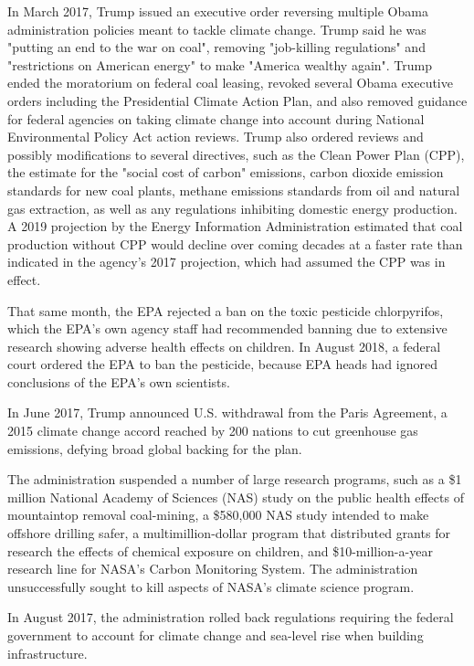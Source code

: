In March 2017, Trump issued an executive order reversing multiple Obama
administration policies meant to tackle climate change. Trump said he
was "putting an end to the war on coal", removing "job-killing
regulations" and "restrictions on American energy" to make "America
wealthy again". Trump ended the moratorium on federal coal leasing,
revoked several Obama executive orders including the Presidential
Climate Action Plan, and also removed guidance for federal agencies on
taking climate change into account during National Environmental Policy
Act action reviews. Trump also ordered reviews and possibly
modifications to several directives, such as the Clean Power Plan (CPP),
the estimate for the "social cost of carbon" emissions, carbon dioxide
emission standards for new coal plants, methane emissions standards from
oil and natural gas extraction, as well as any regulations inhibiting
domestic energy production. A 2019 projection by the Energy Information
Administration estimated that coal production without CPP would decline
over coming decades at a faster rate than indicated in the agency's 2017
projection, which had assumed the CPP was in effect.

That same month, the EPA rejected a ban on the toxic pesticide
chlorpyrifos, which the EPA's own agency staff had recommended banning
due to extensive research showing adverse health effects on children. In
August 2018, a federal court ordered the EPA to ban the pesticide,
because EPA heads had ignored conclusions of the EPA's own scientists.

In June 2017, Trump announced U.S. withdrawal from the Paris Agreement,
a 2015 climate change accord reached by 200 nations to cut greenhouse
gas emissions, defying broad global backing for the plan.

The administration suspended a number of large research programs, such
as a \$1 million National Academy of Sciences (NAS) study on the public
health effects of mountaintop removal coal-mining, a \$580,000 NAS study
intended to make offshore drilling safer, a multimillion-dollar program
that distributed grants for research the effects of chemical exposure on
children, and \$10-million-a-year research line for NASA's Carbon
Monitoring System. The administration unsuccessfully sought to kill
aspects of NASA's climate science program.

In August 2017, the administration rolled back regulations requiring the
federal government to account for climate change and sea-level rise when
building infrastructure.

